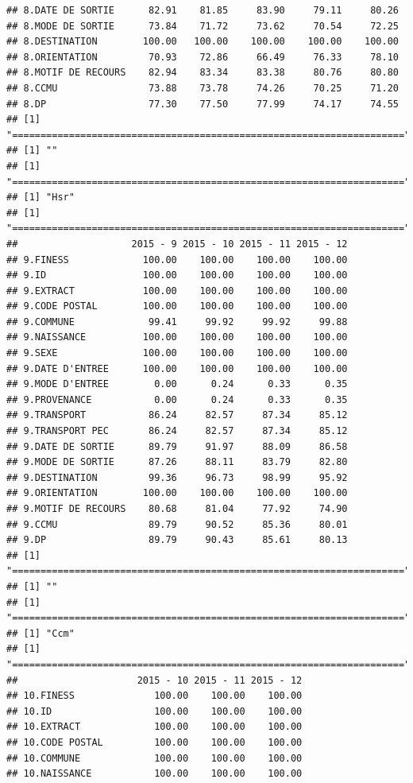 \documentclass[]{article}
\begin{document}
\begin{verbatim}
## 8.DATE DE SORTIE      82.91    81.85     83.90     79.11     80.26
## 8.MODE DE SORTIE      73.84    71.72     73.62     70.54     72.25
## 8.DESTINATION        100.00   100.00    100.00    100.00    100.00
## 8.ORIENTATION         70.93    72.86     66.49     76.33     78.10
## 8.MOTIF DE RECOURS    82.94    83.34     83.38     80.76     80.80
## 8.CCMU                73.88    73.78     74.26     70.25     71.20
## 8.DP                  77.30    77.50     77.99     74.17     74.55
## [1] "====================================================================="
## [1] ""
## [1] "====================================================================="
## [1] "Hsr"
## [1] "====================================================================="
##                    2015 - 9 2015 - 10 2015 - 11 2015 - 12
## 9.FINESS             100.00    100.00    100.00    100.00
## 9.ID                 100.00    100.00    100.00    100.00
## 9.EXTRACT            100.00    100.00    100.00    100.00
## 9.CODE POSTAL        100.00    100.00    100.00    100.00
## 9.COMMUNE             99.41     99.92     99.92     99.88
## 9.NAISSANCE          100.00    100.00    100.00    100.00
## 9.SEXE               100.00    100.00    100.00    100.00
## 9.DATE D'ENTREE      100.00    100.00    100.00    100.00
## 9.MODE D'ENTREE        0.00      0.24      0.33      0.35
## 9.PROVENANCE           0.00      0.24      0.33      0.35
## 9.TRANSPORT           86.24     82.57     87.34     85.12
## 9.TRANSPORT PEC       86.24     82.57     87.34     85.12
## 9.DATE DE SORTIE      89.79     91.97     88.09     86.58
## 9.MODE DE SORTIE      87.26     88.11     83.79     82.80
## 9.DESTINATION         99.36     96.73     98.99     95.92
## 9.ORIENTATION        100.00    100.00    100.00    100.00
## 9.MOTIF DE RECOURS    80.68     81.04     77.92     74.90
## 9.CCMU                89.79     90.52     85.36     80.01
## 9.DP                  89.79     90.43     85.61     80.13
## [1] "====================================================================="
## [1] ""
## [1] "====================================================================="
## [1] "Ccm"
## [1] "====================================================================="
##                     2015 - 10 2015 - 11 2015 - 12
## 10.FINESS              100.00    100.00    100.00
## 10.ID                  100.00    100.00    100.00
## 10.EXTRACT             100.00    100.00    100.00
## 10.CODE POSTAL         100.00    100.00    100.00
## 10.COMMUNE             100.00    100.00    100.00
## 10.NAISSANCE           100.00    100.00    100.00

\end{verbatim}
\end{document}
